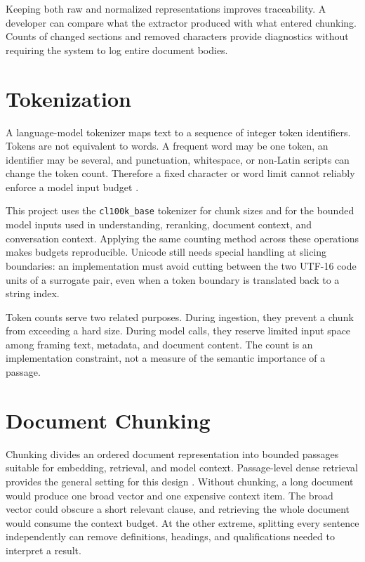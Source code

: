 Keeping both raw and normalized representations improves traceability. A developer can compare what the extractor produced with what entered chunking. Counts of changed sections and removed characters provide diagnostics without requiring the system to log entire document bodies.

\section{Tokenization}
\label{sec:background-tokenization}

A language-model tokenizer maps text to a sequence of integer token identifiers. Tokens are not equivalent to words. A frequent word may be one token, an identifier may be several, and punctuation, whitespace, or non-Latin scripts can change the token count. Therefore a fixed character or word limit cannot reliably enforce a model input budget \cite{MicrosoftMLTokenizers}.

This project uses the \texttt{cl100k\_base} tokenizer for chunk sizes and for the bounded model inputs used in understanding, reranking, document context, and conversation context. Applying the same counting method across these operations makes budgets reproducible. Unicode still needs special handling at slicing boundaries: an implementation must avoid cutting between the two UTF-16 code units of a surrogate pair, even when a token boundary is translated back to a string index.

Token counts serve two related purposes. During ingestion, they prevent a chunk from exceeding a hard size. During model calls, they reserve limited input space among framing text, metadata, and document content. The count is an implementation constraint, not a measure of the semantic importance of a passage.

\section{Document Chunking}
\label{sec:background-chunking}

Chunking divides an ordered document representation into bounded passages suitable for embedding, retrieval, and model context. Passage-level dense retrieval provides the general setting for this design \cite{Karpukhin2020DPR,Luan2021SparseDense}. Without chunking, a long document would produce one broad vector and one expensive context item. The broad vector could obscure a short relevant clause, and retrieving the whole document would consume the context budget. At the other extreme, splitting every sentence independently can remove definitions, headings, and qualifications needed to interpret a result.

